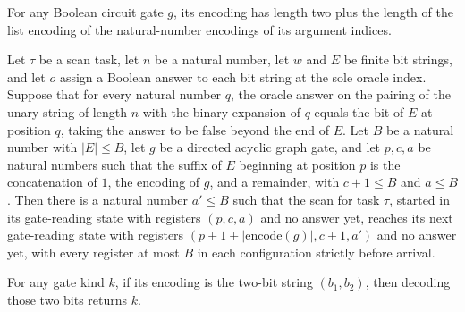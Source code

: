 \begin{lemma}
\label{BoolCircuit.AdjScan.length_gate_encode}
\leanok
{}
For any Boolean circuit gate $g$, its encoding has length two plus the length of the
list encoding of the natural-number encodings of its argument indices.
\end{lemma}

\begin{lemma}
\label{BoolCircuit.AdjScan.gateSkip}
\leanok
{}
Let $\tau$ be a scan task, let $n$ be a natural number, let $w$ and $E$ be finite bit
strings, and let $o$ assign a Boolean answer to each bit string at the sole oracle
index. Suppose that for every natural number $q$, the oracle answer on the pairing of
the unary string of length $n$ with the binary expansion of $q$ equals the bit of $E$ at
position $q$, taking the answer to be false beyond the end of $E$. Let $B$ be a natural
number with $|E|\le B$, let $g$ be a directed acyclic graph gate, and let $p,c,a$ be
natural numbers such that the suffix of $E$ beginning at position $p$ is the
concatenation of $1$, the encoding of $g$, and a remainder, with $c+1\le B$ and $a\le
B$. Then there is a natural number $a'\le B$ such that the scan for task $\tau$, started
in its gate-reading state with registers $(p,c,a)$ and no answer yet, reaches its next
gate-reading state with registers $(p+1+|\mathrm{encode}(g)|,c+1,a')$ and no answer yet,
with every register at most $B$ in each configuration strictly before arrival.
\end{lemma}

\begin{lemma}
\label{BoolCircuit.AdjScan.decodeKind_encode}
\leanok
{}
For any gate kind $k$, if its encoding is the two-bit string $(b_1,b_2)$, then decoding
those two bits returns $k$.
\end{lemma}

